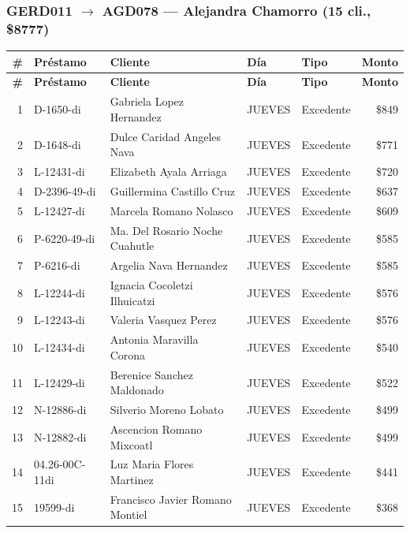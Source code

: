 \documentclass[11pt,a4paper]{article}
\newcommand{\money}[1]{\$\num{#1}}
\begin{document}
\subsubsection{GERD011 $\rightarrow$ AGD078 --- Alejandra Chamorro (15 cli., \money{8777})}


\begin{center}
\renewcommand{\arraystretch}{1.1}
\footnotesize
\begin{longtable}{rlp{5.5cm}llr}
\toprule
\textbf{\#} & \textbf{Pr\'estamo} & \textbf{Cliente} & \textbf{D\'ia} & \textbf{Tipo} & \textbf{Monto} \\
\midrule
\endfirsthead
\toprule
\textbf{\#} & \textbf{Pr\'estamo} & \textbf{Cliente} & \textbf{D\'ia} & \textbf{Tipo} & \textbf{Monto} \\
\midrule
\endhead
1 & D-1650-di & Gabriela Lopez Hernandez & JUEVES & Excedente & \money{849} \\
2 & D-1648-di & Dulce Caridad Angeles Nava & JUEVES & Excedente & \money{771} \\
3 & L-12431-di & Elizabeth Ayala Arriaga & JUEVES & Excedente & \money{720} \\
4 & D-2396-49-di & Guillermina Castillo Cruz & JUEVES & Excedente & \money{637} \\
5 & L-12427-di & Marcela Romano Nolasco & JUEVES & Excedente & \money{609} \\
6 & P-6220-49-di & Ma. Del Rosario Noche Cuahutle & JUEVES & Excedente & \money{585} \\
7 & P-6216-di & Argelia Nava Hernandez & JUEVES & Excedente & \money{585} \\
8 & L-12244-di & Ignacia Cocoletzi Ilhuicatzi & JUEVES & Excedente & \money{576} \\
9 & L-12243-di & Valeria Vasquez Perez & JUEVES & Excedente & \money{576} \\
10 & L-12434-di & Antonia Maravilla Corona & JUEVES & Excedente & \money{540} \\
11 & L-12429-di & Berenice Sanchez Maldonado & JUEVES & Excedente & \money{522} \\
12 & N-12886-di & Silverio Moreno Lobato & JUEVES & Excedente & \money{499} \\
13 & N-12882-di & Ascencion Romano Mixcoatl & JUEVES & Excedente & \money{499} \\
14 & 04.26-00C-11di & Luz Maria Flores Martinez & JUEVES & Excedente & \money{441} \\
15 & 19599-di & Francisco Javier Romano Montiel & JUEVES & Excedente & \money{368} \\

\bottomrule
\end{longtable}
\end{center}
\end{document}
